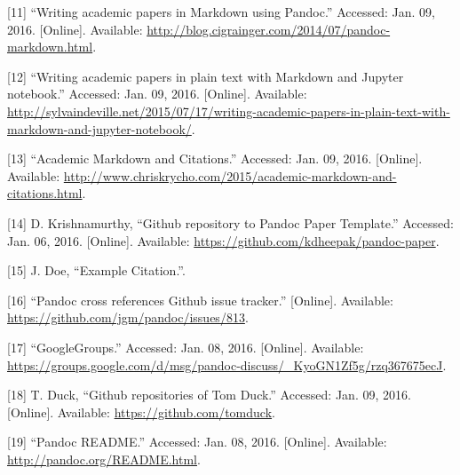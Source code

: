 \documentclass[journal,]{IEEEtran}
\begin{document}
\begin{cslreferences}
\leavevmode\hypertarget{ref-noauthor_writing_nodate}{}%
{[}11{]} ``Writing academic papers in Markdown using Pandoc.'' Accessed:
Jan. 09, 2016. {[}Online{]}. Available:
\url{http://blog.cigrainger.com/2014/07/pandoc-markdown.html}.

\leavevmode\hypertarget{ref-noauthor_writing_nodate-1}{}%
{[}12{]} ``Writing academic papers in plain text with Markdown and
Jupyter notebook.'' Accessed: Jan. 09, 2016. {[}Online{]}. Available:
\url{http://sylvaindeville.net/2015/07/17/writing-academic-papers-in-plain-text-with-markdown-and-jupyter-notebook/}.

\leavevmode\hypertarget{ref-noauthor_academic_nodate}{}%
{[}13{]} ``Academic Markdown and Citations.'' Accessed: Jan. 09, 2016.
{[}Online{]}. Available:
\url{http://www.chriskrycho.com/2015/academic-markdown-and-citations.html}.

\leavevmode\hypertarget{ref-krishnamurthy_github_nodate-1}{}%
{[}14{]} D. Krishnamurthy, ``Github repository to Pandoc Paper
Template.'' Accessed: Jan. 06, 2016. {[}Online{]}. Available:
\url{https://github.com/kdheepak/pandoc-paper}.

\leavevmode\hypertarget{ref-citation_example}{}%
{[}15{]} J. Doe, ``Example Citation.''.

\leavevmode\hypertarget{ref-noauthor_pandoc_nodate}{}%
{[}16{]} ``Pandoc cross references Github issue tracker.'' {[}Online{]}.
Available: \url{https://github.com/jgm/pandoc/issues/813}.

\leavevmode\hypertarget{ref-noauthor_googlegroups_nodate}{}%
{[}17{]} ``GoogleGroups.'' Accessed: Jan. 08, 2016. {[}Online{]}.
Available:
\url{https://groups.google.com/d/msg/pandoc-discuss/_KyoGN1Zf5g/rzq367675ecJ}.

\leavevmode\hypertarget{ref-duck_github_nodate}{}%
{[}18{]} T. Duck, ``Github repositories of Tom Duck.'' Accessed: Jan.
09, 2016. {[}Online{]}. Available: \url{https://github.com/tomduck}.

\leavevmode\hypertarget{ref-noauthor_pandoc_nodate-1}{}%
{[}19{]} ``Pandoc README.'' Accessed: Jan. 08, 2016. {[}Online{]}.
Available: \url{http://pandoc.org/README.html}.
\end{cslreferences}
\end{document}
